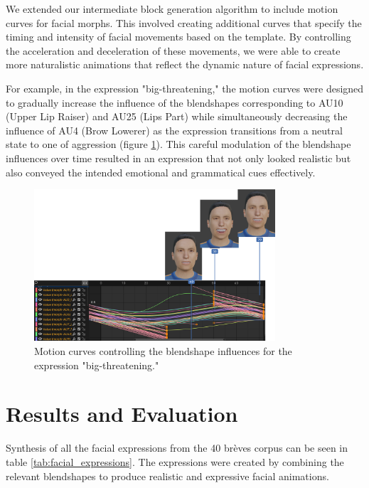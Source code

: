 \documentclass[../../main.tex]{subfiles}
\begin{document}
We extended our intermediate block generation algorithm to include motion curves for facial morphs. This involved creating additional curves that specify the timing and intensity of facial movements based on the template. By controlling the acceleration and deceleration of these movements, we were able to create more naturalistic animations that reflect the dynamic nature of facial expressions.

For example, in the expression "big-threatening," the motion curves were designed to gradually increase the influence of the blendshapes corresponding to AU10 (Upper Lip Raiser) and AU25 (Lips Part) while simultaneously decreasing the influence of AU4 (Brow Lowerer) as the expression transitions from a neutral state to one of aggression (figure \ref{fig:motion_curve_example}). This careful modulation of the blendshape influences over time resulted in an expression that not only looked realistic but also conveyed the intended emotional and grammatical cues effectively.

\begin{figure}
    \centering
    \includegraphics[width=0.8\textwidth]{chapters/facial_expressions/images/motion_curve_example.png}
    \caption{Motion curves controlling the blendshape influences for the expression "big-threatening."}
    \label{fig:motion_curve_example}
\end{figure}

\section{Results and Evaluation}
\label{ch:facial_expressions:results}

Synthesis of all the facial expressions from the 40 brèves corpus can be seen in table \ref{tab:facial_expressions}. The expressions were created by combining the relevant blendshapes  to produce realistic and expressive facial animations.
\end{document}
